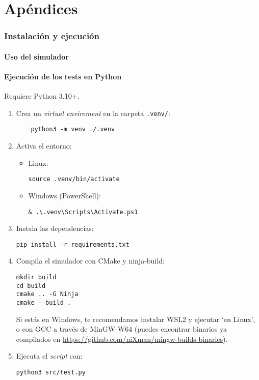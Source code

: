 \part{Apéndices}

\section*{Instalación y ejecución}

\subsection*{Uso del simulador}


\subsection*{Ejecución de los tests en Python}
Requiere Python 3.10+.
\begin{enumerate}
  \item Crea un \textit{virtual enviroment} en la carpeta \texttt{.venv/}:
  \begin{verbatim}
    python3 -m venv ./.venv
  \end{verbatim}
  \item Activa el entorno:
  \begin{itemize}
    \item Linux:
    \begin{verbatim}
source .venv/bin/activate
    \end{verbatim}
    \item Windows (PowerShell):
    \begin{verbatim}
& .\.venv\Scripts\Activate.ps1
    \end{verbatim}
  \end{itemize}
  \item Instala las dependencias:
  \begin{verbatim}
pip install -r requirements.txt
  \end{verbatim}
  \item Compila el simulador con CMake y ninja-build:
  \begin{verbatim}
mkdir build
cd build
cmake .. -G Ninja
cmake --build .
  \end{verbatim}
  Si estás en Windows, te recomendamos instalar WSL2 y ejecutar `en Linux', o con GCC a través de MinGW-W64 (puedes encontrar binarios ya compilados en \url{https://github.com/niXman/mingw-builds-binaries}).
  \item Ejecuta el \textit{script} con:
  \begin{verbatim}
python3 src/test.py
  \end{verbatim}
\end{enumerate}
